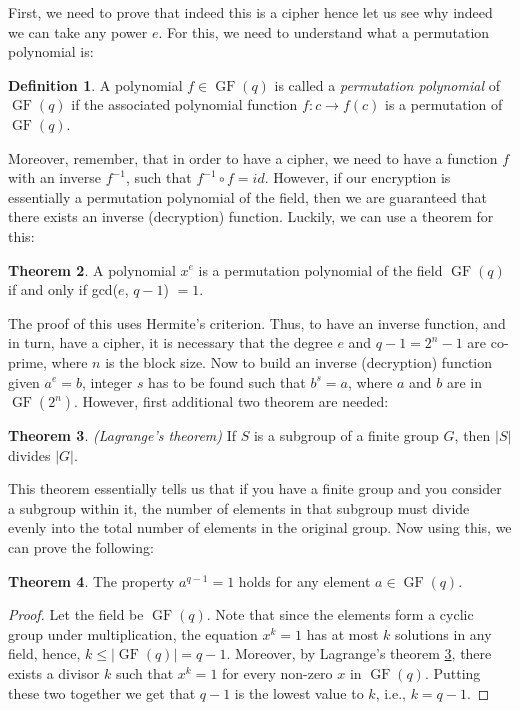 \documentclass{Resources/UoBLab1}
\theoremstyle{definition}
\newtheorem{theorem}{Theorem}[section]
\newtheorem{definition}[theorem]{Definition}
\begin{document}
First, we need to prove that indeed this is a cipher hence let us see why indeed we can take any power $e$. For this, we need to understand what a permutation polynomial is:
\begin{definition}
    A polynomial $f \in \operatorname{GF}(q)$ is called a \textit{permutation polynomial} of $\operatorname{GF}(q)$ if the associated polynomial function $f : c \to f(c)$ is a permutation of $\operatorname{GF}(q)$.
\end{definition}
Moreover, remember, that in order to have a cipher, we need to have a function $f$ with an inverse $f^{-1}$, such that $f^{-1} \circ f = id$. However, if our encryption is essentially a permutation polynomial of the field, then we are guaranteed that there exists an inverse (decryption) function. Luckily, we can use a theorem for this:
\begin{theorem}
    A polynomial $x^e$ is a permutation polynomial of the field $\operatorname{GF}(q)$ if and only if gcd($e$, $q - 1$) $= 1$.
\end{theorem}
The proof of this uses Hermite's criterion\cite{PPIntro}. Thus, to have an inverse function, and in turn, have a cipher, it is necessary that the degree $e$ and $q - 1 = 2^n - 1$ are co-prime, where $n$ is the block size. Now to build an inverse (decryption) function given $a^e = b$, integer $s$ has to be found such that $b^s = a$, where $a$ and $b$ are in $\operatorname{GF}(2^n)$. However, first additional two theorem are needed:
\begin{theorem}\label{thm:Lagrange}
    \textit{(Lagrange's theorem)} If $S$ is a subgroup of a finite group $G$, then $|S|$ divides $|G|$.
\end{theorem}
This theorem essentially tells us that if you have a finite group and you consider a subgroup within it, the number of elements in that subgroup must divide evenly into the total number of elements in the original group. Now using this, we can prove the following:
\begin{theorem}\label{thm:GroupProp}
    The property $a^{q-1} = 1$ holds for any element $a \in \operatorname{GF}(q)$.
\end{theorem}
\begin{proof}
    Let the field be $\operatorname{GF}(q)$. Note that since the elements form a cyclic group under multiplication, the equation $x^k = 1$ has at most $k$ solutions in any field, hence, $k \le |\operatorname{GF}(q)| = q - 1$. Moreover, by Lagrange's theorem \ref{thm:Lagrange}, there exists a divisor $k$ such that $x^k = 1$ for every non-zero $x$ in $\operatorname{GF}(q)$. Putting these two together we get that $q-1$ is the lowest value to $k$, i.e., $k = q - 1$.
\end{proof}
\end{document}
